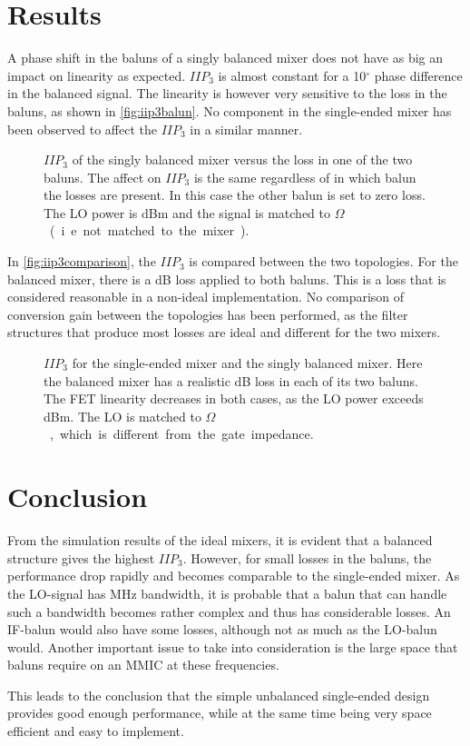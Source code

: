 	\section{Results}
		A phase shift in the baluns of a singly balanced mixer does not have as big an impact on linearity as expected. $IIP_3$ is almost constant for a 10$^\circ$ phase difference in the balanced signal. The linearity is however very sensitive to the loss in the baluns, as shown in \autoref{fig:iip3balun}. No component in the single-ended mixer has been observed to affect the $IIP_3$ in a similar manner.

		\begin{figure}[hbt!]
			\centering
			\caption{$IIP_3$ of the singly balanced mixer versus the loss in one of the two baluns. The affect on $IIP_3$ is the same regardless of in which balun the losses are present. In this case the other balun is set to zero loss. The LO power is \unit[12]{dBm} and the signal is matched to \unit[50]{$\Omega$} (i.e. not matched to the mixer).}\label{fig:iip3balun}
		\end{figure}

		In \autoref{fig:iip3comparison}, the $IIP_3$ is compared between the two topologies. For the balanced mixer, there is a \unit[2]{dB} loss applied to both baluns. This is a loss that is considered reasonable in a non-ideal implementation. No comparison of conversion gain between the topologies has been performed, as the filter structures that produce most losses are ideal and different for the two mixers.

		\begin{figure}[hpt!]
			\centering
			\caption{$IIP_3$ for  the single-ended mixer and  the singly balanced mixer. Here the balanced mixer has a realistic \unit[2]{dB} loss in each of its two baluns. The FET linearity decreases in both cases, as the LO power exceeds \unit[14]{dBm}. The LO is matched to \unit[50]{$\Omega$}, which is different from the gate impedance.}\label{fig:iip3comparison}
		\end{figure}

	\section{Conclusion}
		From the simulation results of the ideal mixers, it is evident that a balanced structure gives the highest $IIP_3$. However, for small losses in the baluns, the performance drop rapidly and becomes comparable to the single-ended mixer. As the LO-signal has \unit[500]{MHz} bandwidth, it is probable that a balun that can handle such a bandwidth becomes rather complex and thus has considerable losses. An IF-balun would also have some losses, although not as much as the LO-balun would. Another important issue to take into consideration is the large space that baluns require on an MMIC at these frequencies.

		This leads to the conclusion that the simple unbalanced single-ended design provides good enough performance, while at the same time being very space efficient and easy to implement.
